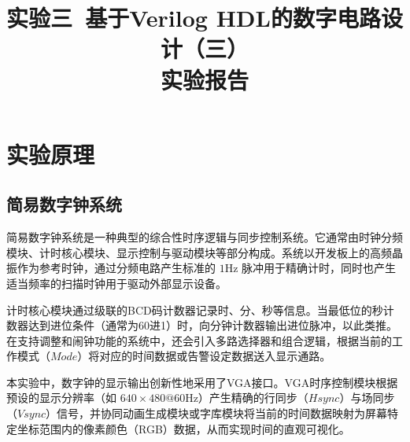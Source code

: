 \documentclass[11pt,a4paper]{article}
\title{实验三\  基于Verilog HDL的数字电路设计（三）\\ \vspace{0.5em}\large 实验报告}
\date{}
\begin{document}
\maketitle
\section{实验原理}

\subsection{简易数字钟系统}

简易数字钟系统是一种典型的综合性时序逻辑与同步控制系统。它通常由时钟分频模块、计时核心模块、显示控制与驱动模块等部分构成。系统以开发板上的高频晶振作为参考时钟，通过分频电路产生标准的 \(1\mathrm{Hz}\) 脉冲用于精确计时，同时也产生适当频率的扫描时钟用于驱动外部显示设备。
\vspace{0.5em}

计时核心模块通过级联的BCD码计数器记录时、分、秒等信息。当最低位的秒计数器达到进位条件（通常为60进1）时，向分钟计数器输出进位脉冲，以此类推。在支持调整和闹钟功能的系统中，还会引入多路选择器和组合逻辑，根据当前的工作模式（\(Mode\)）将对应的时间数据或告警设定数据送入显示通路。
\vspace{0.5em}

本实验中，数字钟的显示输出创新性地采用了VGA接口。VGA时序控制模块根据预设的显示分辨率（如 \(640 \times 480 @ 60\mathrm{Hz}\)）产生精确的行同步（\(Hsync\)）与场同步（\(Vsync\)）信号，并协同动画生成模块或字库模块将当前的时间数据映射为屏幕特定坐标范围内的像素颜色（RGB）数据，从而实现时间的直观可视化。
\end{document}
